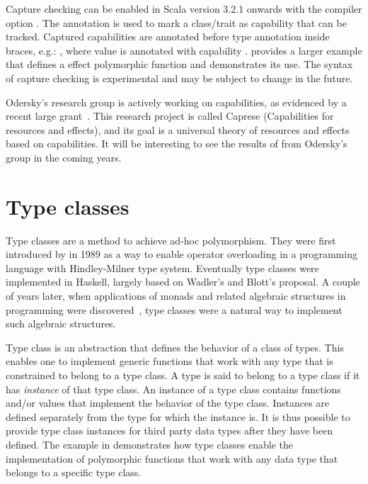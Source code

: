 Capture checking can be enabled in Scala version 3.2.1 onwards with the compiler option . The annotation  is used to mark a class/trait as capability that can be tracked. Captured capabilities are annotated before type annotation inside braces, e.g.: , where value  is annotated with capability .  provides a larger example that defines a effect polymorphic  function and demonstrates its use. The syntax of capture checking is experimental and may be subject to change in the future.



Odersky's research group is actively working on capabilities, as evidenced by a recent large grant~\cite{capture-checking-grant}. This research project is called Caprese (Capabilities for resources and effects), and its goal is a universal theory of resources and effects based on capabilities. It will be interesting to see the results of from Odersky's group in the coming years.



\section{Type classes}
Type classes are a method to achieve ad-hoc polymorphism. They were first introduced by \textcite{ad-hoc-less-ad-hoc} in 1989 as a way to enable operator overloading in a programming language with Hindley-Milner type system. Eventually type classes were implemented in Haskell, largely based on Wadler's and Blott's proposal. A couple of years later, when applications of monads and related algebraic structures in programming were discovered~\cite{comp-lambda-monads}, type classes were a natural way to implement such algebraic structures.

Type class is an abstraction that defines the behavior of a class of types. This enables one to implement generic functions that work with any type that is constrained to belong to a type class. A type is said to belong to a type class if it has \textit{instance} of that type class. An instance of a type class contains functions and/or values that implement the behavior of the type class. Instances are defined separately from the type for which the instance is. It is thus possible to provide type class instances for third party data types after they have been defined. The example in  demonstrates how type classes enable the implementation of polymorphic functions that work with any data type that belongs to a specific type class.

